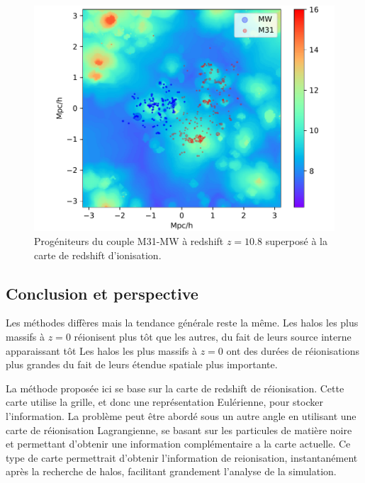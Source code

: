 \begin{figure}
		\centering
		\includegraphics[width=.95\linewidth]{img/05/map_LG.pdf}
        \caption[Réionisation du groupe local]{Progéniteurs du couple M31-MW à redshift $z=10.8$ superposé à la carte de redshift d'ionisation.
		\label{fig:CODA_LG}}
\end{figure}

\subsection{Conclusion et perspective}

Les méthodes diffères mais la tendance générale reste la même.
Les halos les plus massifs à $z=0$ réionisent plus tôt que les autres, du fait de leurs source interne apparaissant tôt
Les halos les plus massifs à $z=0$ ont des durées de réionisations plus grandes du fait de leurs étendue spatiale plus importante.


La méthode proposée ici se base sur la carte de redshift de réionisation.
Cette carte utilise la grille, et donc une représentation Eulérienne, pour stocker l'information.%
La problème peut être abordé sous un autre angle en utilisant une carte de réionisation Lagrangienne, se basant sur les particules de matière noire et permettant d'obtenir une information complémentaire a la carte actuelle.
Ce type de carte permettrait d'obtenir l'information de reionisation, instantanément après la recherche de halos, facilitant grandement l'analyse de la simulation.


